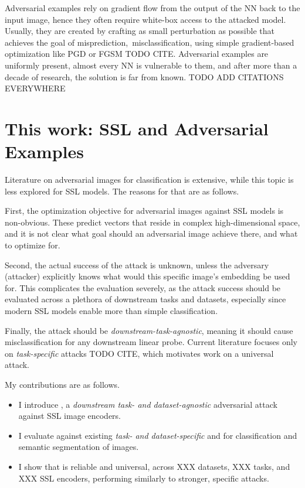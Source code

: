 Adversarial examples rely on gradient flow from the output of the NN back to the input image, hence they often require white-box access to the attacked model. Usually, they are created by crafting as small perturbation as possible that achieves the goal of misprediction,~\eg misclassification, using simple gradient-based optimization like PGD or FGSM TODO CITE. Adversarial examples are uniformly present, almost every NN is vulnerable to them, and after more than a decade of research, the solution is far from known. TODO ADD CITATIONS EVERYWHERE

\section{This work: SSL and Adversarial Examples}

Literature on adversarial images for classification is extensive, while this topic is less explored for SSL models. 
The reasons for that are as follows. 

First, the optimization objective for adversarial images against SSL models is non-obvious. These predict vectors that reside in complex high-dimensional space, and it is not clear what goal should an adversarial image achieve there, and what to optimize for. 

Second, the actual success of the attack is unknown, unless the adversary (attacker) explicitly knows what would this specific image's embedding be used for. This complicates the evaluation severely, as the attack success should be evaluated across a plethora of downstream tasks and datasets, especially since modern SSL models enable more than simple classification. 

Finally, the attack should be \textit{downstream-task-agnostic}, meaning it should cause misclassification for any downstream linear probe. Current literature focuses only on \textit{task-specific} attacks TODO CITE, which motivates work on a universal attack.

My contributions are as follows.
\begin{itemize}
    \item I introduce \EmbedAttack, a \textit{downstream task- and dataset-agnostic} adversarial attack against SSL image encoders.
    \item I evaluate \EmbedAttack against existing \textit{task- and dataset-specific} \PGD and \SegPGD for classification and semantic segmentation of images.
    \item I show that \EmbedAttack is reliable and universal, across XXX datasets, XXX tasks, and XXX SSL encoders, performing similarly to stronger, specific attacks.
\end{itemize}


















